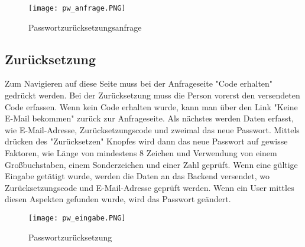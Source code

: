 \begin{center}
\begin{figure}[h]
    \centering
    \texttt{[image: pw\_anfrage.PNG]}
    \caption{Passwortzurücksetzungsanfrage}
\end{figure}
\end{center}
\newpage

\subsection{Zurücksetzung}
Zum Navigieren auf diese Seite muss bei der Anfrageseite "Code erhalten" gedrückt werden. Bei der Zurücksetzung muss die Person vorerst den versendeten Code erfassen. Wenn kein Code erhalten wurde, kann man über den Link "Keine E-Mail bekommen" zurück zur Anfrageseite. Als nächstes werden Daten erfasst, wie E-Mail-Adresse, Zurücksetzungscode und zweimal das neue Passwort.
Mittels drücken des "Zurücksetzen" Knopfes wird dann das neue Passwort auf gewisse Faktoren, wie Länge von mindestens 8 Zeichen und Verwendung von einem Großbuchstaben, einem Sonderzeichen und einer Zahl geprüft.
Wenn eine gültige Eingabe getätigt wurde, werden die Daten an das Backend versendet, wo Zurücksetzungscode und E-Mail-Adresse geprüft werden. Wenn ein User mittles diesen Aspekten gefunden wurde, wird das Passwort geändert.

\begin{center}
\begin{figure}[h]
	\centering
	\texttt{[image: pw\_eingabe.PNG]}
	\caption{Passwortzurücksetzung}
\end{figure}
\end{center}